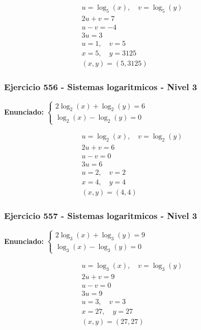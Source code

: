 \documentclass[12pt,a4paper]{article}
\begin{document}
\[
\begin{aligned}
u=\log_{5}\left(x\right),\quad v=\log_{5}\left(y\right)\\
2u+v=7\\
u-v=-4\\
3u=3\\
u=1,\quad v=5\\
x=5,\quad y=3125\\
\boxed{(x,y)=(5,3125)}
\end{aligned}
\]


\subsubsection*{Ejercicio 556 - Sistemas logaritmicos - Nivel 3}
\textbf{Enunciado:} \(\begin{cases} 2\log_{2}\left(x\right)+\log_{2}\left(y\right)=6\\ \log_{2}\left(x\right)-\log_{2}\left(y\right)=0\end{cases}\)

\[
\begin{aligned}
u=\log_{2}\left(x\right),\quad v=\log_{2}\left(y\right)\\
2u+v=6\\
u-v=0\\
3u=6\\
u=2,\quad v=2\\
x=4,\quad y=4\\
\boxed{(x,y)=(4,4)}
\end{aligned}
\]


\subsubsection*{Ejercicio 557 - Sistemas logaritmicos - Nivel 3}
\textbf{Enunciado:} \(\begin{cases} 2\log_{3}\left(x\right)+\log_{3}\left(y\right)=9\\ \log_{3}\left(x\right)-\log_{3}\left(y\right)=0\end{cases}\)

\[
\begin{aligned}
u=\log_{3}\left(x\right),\quad v=\log_{3}\left(y\right)\\
2u+v=9\\
u-v=0\\
3u=9\\
u=3,\quad v=3\\
x=27,\quad y=27\\
\boxed{(x,y)=(27,27)}
\end{aligned}
\]
\end{document}
